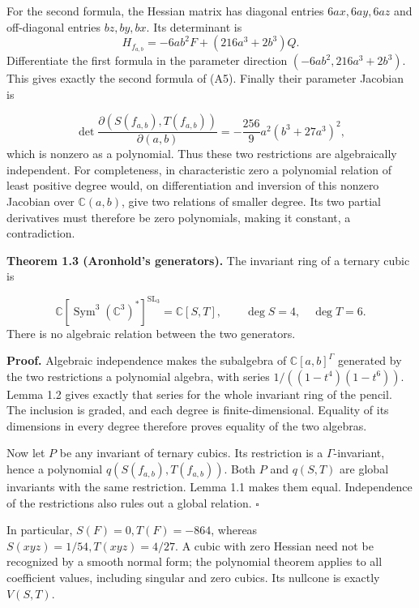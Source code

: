 \documentclass[
]{article}
\begin{document}
For the second formula, the Hessian matrix has diagonal entries
\(6ax,6ay,6az\) and off-diagonal entries \(bz,by,bx\). Its determinant
is \[
H_{f_{a,b}}=-6ab^2F+(216a^3+2b^3)Q.
\] Differentiate the first formula in the parameter direction
\((-6ab^2,216a^3+2b^3)\). This gives exactly the second formula of (A5).
Finally their parameter Jacobian is
\protect{}\label{equation-A6}{}

\[
\det\frac{\partial(S(f_{a,b}),T(f_{a,b}))}{\partial(a,b)}
=-\frac{256}{9}a^2(b^3+27a^3)^2,
\tag{A6}
\] which is nonzero as a polynomial. Thus these two restrictions are
algebraically independent. For completeness, in characteristic zero a
polynomial relation of least positive degree would, on differentiation
and inversion of this nonzero Jacobian over \(\mathbb C(a,b)\), give two
relations of smaller degree. Its two partial derivatives must therefore
be zero polynomials, making it constant, a contradiction.

\protect{}\label{theorem-1-3}{}

\textbf{Theorem 1.3 (Aronhold's generators).} The invariant ring of a
ternary cubic is \protect{}\label{equation-A7}{}

\[
\mathbb C [\operatorname{Sym}^3(\mathbb C^3)^*]^{\operatorname{SL}_3}
=\mathbb C [S,T],\qquad \deg S=4,\quad\deg T=6.
\tag{A7}
\] There is no algebraic relation between the two generators.

\textbf{Proof.} Algebraic independence makes the subalgebra of
\(\mathbb C [a,b]^\Gamma\) generated by the two restrictions a
polynomial algebra, with series \(1/((1-t^4)(1-t^6))\). Lemma 1.2 gives
exactly that series for the whole invariant ring of the pencil. The
inclusion is graded, and each degree is finite-dimensional. Equality of
its dimensions in every degree therefore proves equality of the two
algebras.

Now let \(P\) be any invariant of ternary cubics. Its restriction is a
\(\Gamma\)-invariant, hence a polynomial \(q(S(f_{a,b}),T(f_{a,b}))\).
Both \(P\) and \(q(S,T)\) are global invariants with the same
restriction. Lemma 1.1 makes them equal. Independence of the
restrictions also rules out a global relation. \(\square\)

In particular, \(S(F)=0,T(F)=-864\), whereas
\(S(xyz)=1/54,T(xyz)=4/27\). A cubic with zero Hessian need not be
recognized by a smooth normal form; the polynomial theorem applies to
all coefficient values, including singular and zero cubics. Its nullcone
is exactly \(V(S,T)\).
\end{document}
